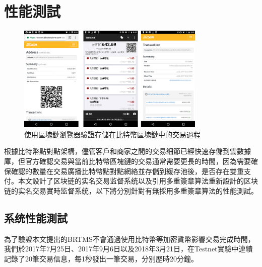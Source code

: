 




	\section{性能測試}


		\begin{figure}[htbp]
			\centering
			\includegraphics[width = 0.8\textwidth]{fig9.png}
			\caption{使用區塊鏈瀏覽器驗證存儲在比特幣區塊鏈中的交易過程}\label{fig9}
		\end{figure}


		根據比特幣點對點架構，儘管客戶和商家之間的交易細節已經快速存儲到雲數據庫，但官方確認交易與當前比特幣區塊鏈的交易通常需要更長的時間，因為需要確保確認的數量在交易廣播比特幣點對點網絡並存儲到緩存池後，是否存在雙重支付。本文設計了区块链的实名交易监督系统以及引用多重簽章算法重新設計的区块链的实名交易實時监督系统，以下將分別針對有無採用多重簽章算法的性能測試。


		\subsection{系统性能測試}
		為了驗證本文提出的BRTMS不會通過使用比特幣等加密貨幣影響交易完成時間，我們於2017年7月25日、2017年9月6日以及2018年3月21日，在Testnet實驗中連續記錄了20筆交易信息，每1秒發出一筆交易，分別歷時20分鐘。

